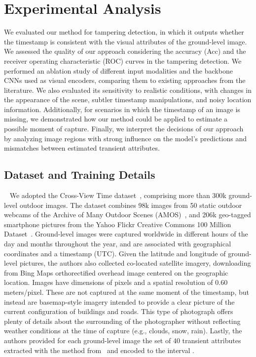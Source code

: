 \documentclass[journal]{IEEEtran}
\begin{document}
\section{Experimental Analysis}\label{sec:exp_analysis}
    We evaluated our method for tampering detection, in which it outputs whether the timestamp is consistent with the visual attributes of the ground-level image. We assessed the quality of our approach considering the accuracy (Acc) and the receiver operating characteristic (ROC) curves in the tampering detection. We performed an ablation study of different input modalities and the backbone CNNs used as visual encoders, comparing them to existing approaches from the literature. We also evaluated its sensitivity to realistic conditions, with changes in the appearance of the scene, subtler timestamp manipulations, and noisy location information. Additionally, for scenarios in which the timestamp of an image is missing, we demonstrated how our method could be applied to estimate a possible moment of capture. Finally, we interpret the decisions of our approach by analyzing image regions with strong influence on the model's predictions and mismatches between estimated transient attributes.



    \subsection{Dataset and Training Details}~\label{sec:dataset_training_details}
        We adopted the Cross-View Time dataset~\cite{salem2020learning}, comprising more than 300k ground-level outdoor images. The dataset combines 98k images from 50 static outdoor webcams of the Archive of Many Outdoor Scenes (AMOS)~\cite{jacobs2007consistent}, and 206k geo-tagged smartphone pictures from the Yahoo Flickr Creative Commons 100 Million Dataset~\cite{thomee2016yfcc100m}.  Ground-level images were captured worldwide in different hours of the day and months throughout the year, and are associated with geographical coordinates and a timestamp (UTC). Given the latitude and longitude of ground-level pictures, the authors also collected co-located satellite imagery, downloading from Bing Maps orthorectified overhead image centered on the geographic location. Images have dimensions of  pixels and a spatial resolution of 0.60 meters/pixel. These are not captured at the same moment of the timestamp, but instead are basemap-style imagery intended to provide a clear picture of the current configuration of buildings and roads. This type of photograph offers plenty of details about the surrounding of the photographer without reflecting weather conditions at the time of capture (e.g., clouds, snow, rain). Lastly, the authors provided for each ground-level image the set of 40 transient attributes extracted with the method from~\cite{laffont2014transient} and encoded to the interval .
        
\end{document}

